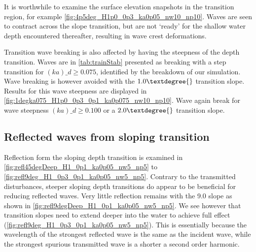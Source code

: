 It is worthwhile to examine the surface elevation snapshots in the transition region, for example \autoref{fig:4p5deg_H1p0_0p3_ka0p05_nw10_np10}.
Waves are seen to contract across the slope transition, but are not `ready' for the shallow water depth encountered thereafter, resulting in wave crest deformations.
\\


Transition wave breaking is also affected by having the steepness of the depth transition. 
Waves are in \autoref{tab:trainStab} presented as breaking with a step transition for $(ka)\_d \geq 0.075$, identified by the breakdown of our simulation. 
Wave breaking is however avoided with the $1.0\textdegree{}$ transition slope. Results for this wave steepness are displayed in \autoref{fig:1degka075_H1p0_0p3_0p1_ka0p075_nw10_np10}.
Wave again break for wave steepness $(ka)\_d \geq 0.100$ or a $2.0\textdegree{}$ transition slope.




\subsection{Reflected waves from sloping transition}
Reflection form the sloping depth transition is examined in \autoref{fig:refl45degDeep_H1_0p1_ka0p05_nw5_np5} to \ref{fig:refl9deg_H1_0p3_0p1_ka0p05_nw5_np5}. 
Contrary to the transmitted disturbances, steeper sloping depth transitions do appear to be beneficial for reducing reflected waves. Very little reflection remains with the 9.0\textdegree{} slope as shown in \autoref{fig:refl9degDeep_H1_0p1_ka0p05_nw5_np5}. We see however that transition slopes need to extend deeper into the water to achieve full effect (\autoref{fig:refl9deg_H1_0p3_0p1_ka0p05_nw5_np5}).
This is essentially because the wavelength of the strongest reflected wave is the same as the incident wave, while the strongest spurious transmitted wave is a shorter a second order harmonic.

